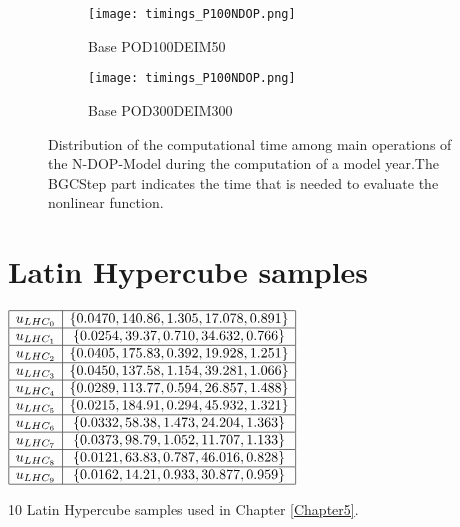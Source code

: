 \begin{figure}[H]
\begin{subfigure}{.48\textwidth}
  \texttt{[image: timings\_P100NDOP.png]}
  \caption{Base POD100DEIM50}
  \label{fig:timings_N-DOPsub1}
\end{subfigure}%
\begin{subfigure}{.5\textwidth}
  \centering
  \texttt{[image: timings\_P100NDOP.png]}
  \caption{Base POD300DEIM300}
  \label{fig:timings_N-DOPsub2}
\end{subfigure}
\caption{Distribution of the computational time among main operations of the N-DOP-Model during the computation of a model year.The BGCStep part indicates the time that is needed to evaluate the nonlinear function.}
\label{fig:comparison_timings_N-DOP}
\end{figure}

\section{Latin Hypercube samples}
\begin{table}[H]
\begin{center} 


$\begin{array}{|l|c|}
\hline
u_{LHC_0} & \{0.0470,140.86,1.305,17.078,0.891\}\\
\hline
u_{LHC_1} & \{0.0254,39.37,0.710,34.632,0.766\}\\
\hline
u_{LHC_2} & \{0.0405,175.83,0.392,19.928,1.251\}\\
\hline
u_{LHC_3} & \{0.0450,137.58,1.154,39.281,1.066\}\\
\hline
u_{LHC_4} & \{0.0289,113.77,0.594,26.857,1.488\}\\
\hline
u_{LHC_5} & \{0.0215,184.91,0.294,45.932,1.321\}\\
\hline
u_{LHC_6} & \{0.0332,58.38,1.473,24.204,1.363\}\\
\hline
u_{LHC_7} & \{0.0373,98.79,1.052,11.707,1.133\}\\
\hline
u_{LHC_8} & \{0.0121,63.83,0.787,46.016,0.828\}\\
\hline
u_{LHC_9} & \{0.0162,14.21,0.933,30.877,0.959\}\\
\hline
\end{array}$
\end{center}
\caption{10 Latin Hypercube samples used in Chapter \ref{Chapter5}.}
 \label{Chapter5:table_lhc_sample}
\end{table}

